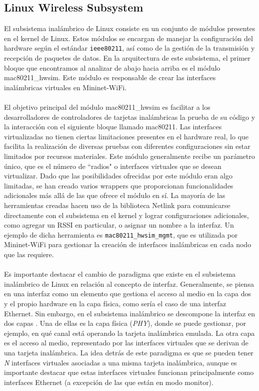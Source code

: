 
\subsection{Linux Wireless Subsystem}
\label{linux_w}

El subsistema inalámbrico de Linux consiste en un conjunto de módulos presentes en el kernel de Linux. Estos módulos se encargan de manejar la configuración del hardware según el estándar \texttt{ieee80211}, así como de la gestión de la transmisión y recepción de paquetes de datos. En la arquitectura de este subsistema, el primer bloque que encontramos al analizar de abajo hacia arriba es el módulo mac80211\_hwsim. Este módulo es responsable de crear las interfaces inalámbricas virtuales en Mininet-WiFi.\\
\\
El objetivo principal del módulo mac80211\_hwsim es facilitar a los desarrolladores de controladores de tarjetas inalámbricas la prueba de su código y la interacción con el siguiente bloque llamado mac80211. Las interfaces virtualizadas no tienen ciertas limitaciones presentes en el hardware real, lo que facilita la realización de diversas pruebas con diferentes configuraciones sin estar limitados por recursos materiales. Este módulo generalmente recibe un parámetro único, que es el número de ``radios" o interfaces virtuales que se desean virtualizar. Dado que las posibilidades ofrecidas por este módulo eran algo limitadas, se han creado varios wrappers que proporcionan funcionalidades adicionales más allá de las que ofrece el módulo en sí. La mayoría de las herramientas creadas hacen uso de la biblioteca Netlink para comunicarse directamente con el subsistema en el kernel y lograr configuraciones adicionales, como agregar un RSSI en particular, o asignar un nombre a la interfaz. Un ejemplo de dicha herramienta es \texttt{mac80211\_hwsim\_mgmt}, que es utilizada por Mininet-WiFi para gestionar la creación de interfaces inalámbricas en cada nodo que las requiere.\\
\\
Es importante destacar el cambio de paradigma que existe en el subsistema inalámbrico de Linux en relación al concepto de interfaz. Generalmente, se piensa en una interfaz como un elemento que gestiona el acceso al medio en la capa dos y el propio hardware en la capa física, como sería el caso de una interfaz Ethernet. Sin embargo, en el subsistema inalámbrico se descompone la interfaz en dos capas \cite{8330098}. Una de ellas es la capa física (\textit{PHY}), donde se puede gestionar, por ejemplo, en qué canal está operando la tarjeta inalámbrica emulada. La otra capa es el acceso al medio, representado por las interfaces virtuales que se derivan de una tarjeta inalámbrica. La idea detrás de este paradigma es que se pueden tener \textit{N} interfaces virtuales asociadas a una misma tarjeta inalámbrica, aunque es importante destacar que estas interfaces virtuales funcionan principalmente como interfaces Ethernet (a excepción de las que están en modo monitor).

